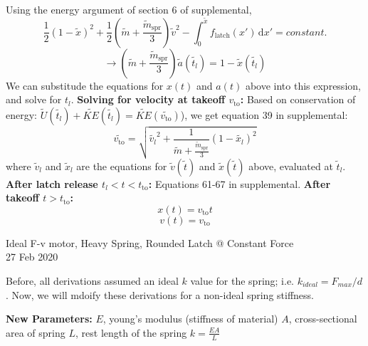 \documentclass[12pt]{article}
\begin{document}
Using the energy argument of section 6 of supplemental,
\[
    \frac{1}{2}(1-\tilde{x})^2 + \frac{1}{2}\left(\tilde{m} + \frac{\tilde{m}_{\text{spr}}}{3} \right)\tilde{v}^2 - \int_0^{\tilde{x}} \! f_{\text{latch}}(x') \, \mathrm{d}x' = constant. 
\]
\[
    \rightarrow \left(\tilde{m} + \frac{\tilde{m}_{\text{spr}}}{3} \right)\tilde{a}(\tilde{t_l}) = 1 - \tilde{x}(\tilde{t_l})
\]
We can substitude the equations for $x(t)$ and $a(t)$ above into this expression, and solve for $t_l$.
\newline 
\newline
\noindent \textbf{Solving for velocity at takeoff $v_{\text{to}}$:}
\newline
Based on conservation of energy: $\tilde{U}(\tilde{t_l}) + \tilde{KE}(\tilde{t_l}) = \tilde{KE}(\tilde{v_{\text{to}}})$), we get equation 39 in supplemental:
\[
    \tilde{v_{\text{to}}} = \sqrt{\tilde{v_l}^2 + \frac{1}{\tilde{m} + \frac{\tilde{m}_{\text{spr}}}{3}} (1 - \tilde{x_l})^2}
\]
where $\tilde{v}_l$ and $\tilde{x}_l$ are the equations for $\tilde{v}(\tilde{t})$ and $\tilde{x}(\tilde{t})$ above, evaluated at $\tilde{t}_l$.
\newline 
\newline
\noindent \textbf{After latch release $t_l < t < t_{\text{to}}$:}
\newline
Equations 61-67 in supplemental.
\newline
\newline
\noindent \textbf{After takeoff $t > t_{\text{to}}$:}
\[
    x(t) = v_{\text{to}}t
\]
\[
    v(t) = v_{\text{to}}
\]

\newpage
\begin{center}
    Ideal F-v motor, Heavy Spring, Rounded Latch @ Constant Force \\
    27 Feb 2020
\end{center}

\noindent
Before, all derivations assumed an ideal $k$ value for the spring; i.e. $k_{ideal} = F_{max} / d$. Now, we will mdoify these derivations for a non-ideal spring stiffness. \newline

\noindent \textbf{New Parameters:}
\newline
$E$, young's modulus (stiffness of material) \newline
$A$, cross-sectional area of spring \newline
$L$, rest length of the spring \newline
$k = \frac{EA}{L}$ \newline
\end{document}
